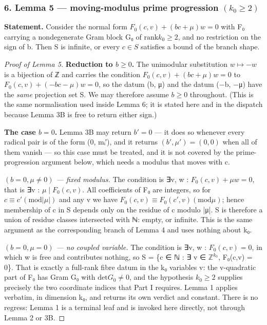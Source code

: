 \subsubsection*{6. Lemma 5 — moving-modulus prime progression $(k_{0} ≥ 2)$}
\textbf{Statement.} Consider the normal form $F_{0}(c, v) + (bc+μ)w = 0$ with F₀ carrying a nondegenerate Gram block G₀ of $\mathrm{rank} k_{0} ≥ 2$, and no restriction on the sign of b. Then S is infinite, or every $c ∈ S$ satisfies a bound of the branch shape.
\begin{proof}[Proof of Lemma 5]

\textbf{Reduction to $b ≥ 0$.} The unimodular substitution $w ↦ −w$ is a bijection of ℤ and carries the condition $F_{0}(c, v) + (bc+μ)w = 0$ to $F_{0}(c, v) + (−bc−μ)w = 0$, so the datum (b, μ) and the datum (−b, −μ) have the \emph{same} projection set S. We may therefore assume $b ≥ 0$ throughout. (This is the same normalisation used inside Lemma 6; it is stated here and in the dispatch because Lemma 3B is free to return either sign.)

\textbf{The case $b = 0$.} Lemma 3B may return $b′ = 0$ — it does so whenever every radical pair is of the form (0, mᵢ′), and it returns $(b′, μ′) = (0,0)$ when all of them vanish — so this case must be treated, and it is not covered by the prime-progression argument below, which needs a modulus that moves with c.

\emph{$(b = 0, μ ≠ 0)$ — fixed modulus.} The condition is ∃v, w : $F_{0}(c,v) + μw = 0$, that is ∃v : $μ ∣ F_{0}(c,v)$. All coefficients of F₀ are integers, so for $c ≡ c′ (\mathrm{mod} |μ|)$ and any v we have $F_{0}(c,v) ≡ F_{0}(c′,v) (\mathrm{mod} μ)$; hence membership of c in S depends only on the residue of c modulo |μ|. S is therefore a union of residue classes intersected with ℕ: empty, or infinite. This is the same argument as the corresponding branch of Lemma 4 and uses nothing about k₀.

\emph{$(b = 0, μ = 0)$ — no coupled variable.} The condition is ∃v, w : $F_{0}(c,v) = 0$, in which w is free and contributes nothing, so S = \{c ∈ ℕ : ∃ v ∈ $ℤ^{k_{0}}$, F₀(c,v) = 0\}. That is exactly a full-rank fibre datum in the k₀ variables v: the v-quadratic part of F₀ has Gram G₀ with $\mathrm{det} G_{0} ≠ 0$, and the hypothesis $k_{0} ≥ 2$ supplies precisely the two coordinate indices that Part I requires. Lemma 1 applies verbatim, in dimension k₀, and returns its own verdict and constant. There is no regress: Lemma 1 is a terminal leaf and is invoked here directly, not through Lemma 2 or 3B.


\end{proof}
